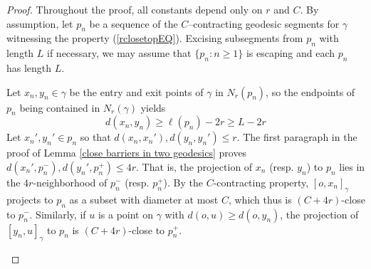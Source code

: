 \documentclass[10pt,a4paper]{amsart}
\begin{document}
\begin{proof}
Throughout the proof, all constants depend only on $r$ and $C$. 
By assumption, let  $p_n$ be a sequence of the $C$--contracting geodesic segments  for $\gamma$ witnessing the property (\ref{rclosetopEQ}). Excising subsegments from $p_n$ with length $L$ if necessary, we may assume that $\{p_n: n\ge 1\}$ is    escaping and each $p_n$ has length  $L$. 

Let $x_n,y_n\in \gamma$ be the entry and exit points of $\gamma$ in $N_r(p_n)$, so the endpoints of $p_n$ being contained in $N_r(\gamma)$ yields $$d(x_n,y_n)\ge \ell(p_n)-2r\ge L-2r$$ Let $x_n', y_n'\in p_n$ so that $d(x_n,x_n'),d(y_n,y_n')\le r$. The first paragraph in the proof of Lemma \ref{close barriers in two geodesics} proves $d(x_n',p_n^-),d(y_n',p_n^+)\le 4r$. That is, the projection of  $x_n$ (resp. $y_n$) to $p_n$ lies in the $4r$-neighborhood of $p_n^-$ (resp. $p_n^+$). By the $C$-contracting property, $[o,x_n]_\gamma$ projects to $p_n$  as a subset with diameter at most $C$, which thus is  $(C+4r)$-close to $p_n^-$. Similarly, if $u$ is a point  on $\gamma$ with $d(o,u)\ge d(o,y_n)$, the projection of $[y_n,u]_\gamma$ to $p_n$ is $(C+4r)$-close to $p_n^+$. 

\begin{figure}
    \centering



\begin{tikzpicture}[x=0.75pt,y=0.75pt,yscale=-1,xscale=1]


\end{tikzpicture}
\end{figure}
\end{proof}
\end{document}
